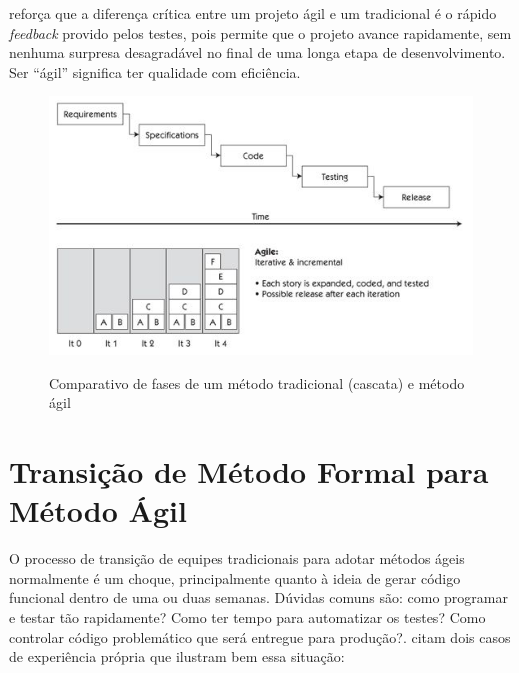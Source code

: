 \documentclass[
	12pt,				%
	openright,			%
	oneside,			%
	a4paper,			%
	english,			%
	brazil,				%
	]{abntex2}
\begin{document}

 reforça que a diferença crítica entre um projeto ágil e um tradicional é o rápido \emph{feedback} provido pelos testes, pois permite que o projeto avance rapidamente, sem nenhuma surpresa desagradável no final de uma longa etapa de desenvolvimento. Ser ``ágil'' significa ter qualidade com eficiência.

\begin{figure}[H]
    \centering
    \caption{Comparativo de fases de um método tradicional (cascata) e método ágil}
    \graphicspath{ {./graphics/agile/} }
    \includegraphics[scale=1.0]{waterfall-vs-agile}
    \label{fig:waterfall-vs-agile}
\end{figure}

\section{Transição de Método Formal para Método Ágil}

O processo de transição de equipes tradicionais para adotar métodos ágeis normalmente é um choque, principalmente quanto à ideia de gerar código funcional dentro de uma ou duas semanas. Dúvidas comuns são: como programar e testar tão rapidamente? Como ter tempo para automatizar os testes? Como controlar código problemático que será entregue para produção?. \cite{crispin2009} citam dois casos de experiência própria que ilustram bem essa situação:
\end{document}
